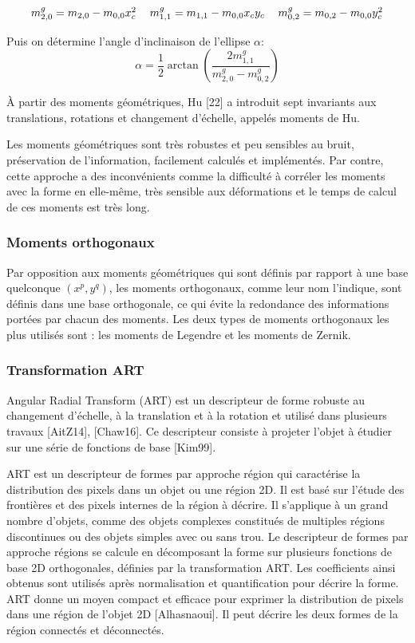\begin{equation}
\begin{tabular}{ccc}
$m_{2, 0}^g = m_{2,0} - m_{0,0} x_{c}^2$ & $m_{1,1}^g = m_{1,1} - m_{0,0} x_{c}y_{c}$ 
& $m_{0,2}^g = m_{0,2} - m_{0,0} y_{c}^2$ 
\end{tabular}
\end{equation}

Puis on détermine l’angle d’inclinaison de l’ellipse $\alpha$:
\begin{equation}
    \alpha = \frac{1}{2} \arctan(\frac{2m_{1,1}^g}{m_{2, 0}^g-m_{0,2}^g})
\end{equation}

À partir des moments géométriques, Hu [22] a introduit sept invariants aux translations,
rotations et changement d’échelle, appelés moments de Hu.



Les moments géométriques sont très robustes et peu sensibles au bruit, préservation de l’information, facilement calculés et implémentés. Par contre, cette approche a des inconvénients comme la difficulté à corréler les moments avec la forme en elle-même, très sensible aux déformations et le temps de calcul de ces moments est très long.

\subsubsection{Moments orthogonaux}
Par opposition aux moments géométriques qui sont définis par rapport à une base quelconque $(x^p, y^q)$, les moments orthogonaux, comme leur nom l’indique, sont définis dans une base orthogonale, ce qui évite la redondance des informations portées par chacun des moments. Les deux types de moments orthogonaux les plus utilisés sont : les moments de Legendre et les moments de Zernik.

\subsubsection{Transformation ART}
Angular Radial Transform (ART) est un descripteur de forme robuste au changement d’échelle, à la translation et à la rotation et utilisé dans plusieurs travaux [AitZ14], [Chaw16]. Ce descripteur consiste à projeter l’objet à étudier sur une série de fonctions de base [Kim99].

ART est un descripteur de formes par approche région qui caractérise la distribution des pixels dans un objet ou une région 2D. Il est basé sur l’étude des frontières et des pixels internes de la région à décrire. Il s’applique à un grand nombre d’objets, comme des objets complexes constitués de multiples régions discontinues ou des objets simples avec ou sans trou. Le descripteur de formes par approche régions se calcule en décomposant la forme sur
plusieurs fonctions de base 2D orthogonales, définies par la transformation ART. Les coefficients ainsi obtenus sont utilisés après normalisation et quantification pour décrire la forme. ART donne un moyen compact et efficace pour exprimer la distribution de pixels dans une région de l’objet 2D [Alhasnaoui]. Il peut décrire les deux formes de la région connectés et déconnectés.\\

